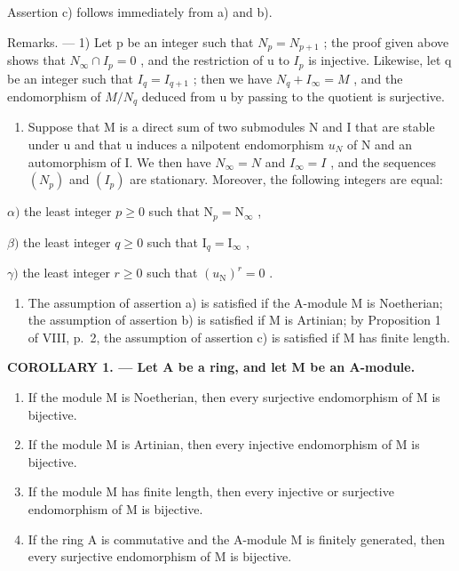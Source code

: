 Assertion c) follows immediately from a) and b).

Remarks. --- 1) Let p be an integer such that \(N_{p} = N_{p+1}\) ; the proof given above shows that \(N_{\infty} \cap I_{p} = 0\) , and the restriction of u to \(I_{p}\) is injective. Likewise, let q be an integer such that \(I_{q} = I_{q+1}\) ; then we have \(N_{q} + I_{\infty} = M\) , and the endomorphism of \(M/N_{q}\) deduced from u by passing to the quotient is surjective.

\begin{enumerate}
\def\labelenumi{\arabic{enumi})}
\setcounter{enumi}{1}
\tightlist
\item
  Suppose that M is a direct sum of two submodules N and I that are stable under u and that u induces a nilpotent endomorphism \(u_{N}\) of N and an automorphism of I. We then have \(N_{\infty} = N\) and \(I_{\infty} = I\) , and the sequences \((N_{p})\) and \((I_{p})\) are stationary. Moreover, the following integers are equal:
\end{enumerate}

\(\alpha)\) the least integer \(p \geqslant 0\) such that \(\mathrm{N}_p = \mathrm{N}_{\infty}\) ,

\(\beta)\) the least integer \(q \geqslant 0\) such that \(\mathrm{I}_q = \mathrm{I}_{\infty}\) ,

\(\gamma)\) the least integer \(r \geqslant 0\) such that \((u_{\mathrm{N}})^{r} = 0\) .

\begin{enumerate}
\def\labelenumi{\arabic{enumi})}
\setcounter{enumi}{2}
\tightlist
\item
  The assumption of assertion a) is satisfied if the A-module M is Noetherian; the assumption of assertion b) is satisfied if M is Artinian; by Proposition 1 of VIII, p.~2, the assumption of assertion c) is satisfied if M has finite length.
\end{enumerate}

\textbf{COROLLARY 1. --- Let A be a ring, and let M be an A-module.}

\begin{enumerate}
\def\labelenumi{\alph{enumi})}
\item
  If the module M is Noetherian, then every surjective endomorphism of M is bijective.
\item
  If the module M is Artinian, then every injective endomorphism of M is bijective.
\item
  If the module M has finite length, then every injective or surjective endomorphism of M is bijective.
\item
  If the ring A is commutative and the A-module M is finitely generated, then every surjective endomorphism of M is bijective.
\end{enumerate}


